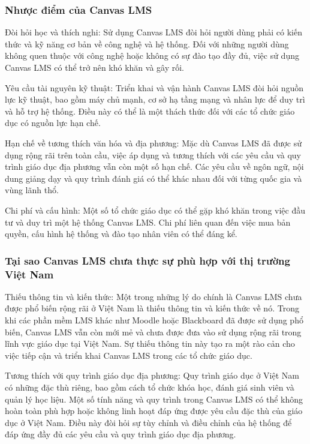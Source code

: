 \documentclass[../Thesis.tex]{subfiles}
\begin{document}
		\subsubsection{Nhược điểm của Canvas LMS}
			Đòi hỏi học và thích nghi: Sử dụng Canvas LMS đòi hỏi người dùng phải có kiến thức và kỹ năng cơ bản về công nghệ và hệ thống. Đối với những người dùng không quen thuộc với công nghệ hoặc không có sự đào tạo đầy đủ, việc sử dụng Canvas LMS có thể trở nên khó khăn và gây rối.

			Yêu cầu tài nguyên kỹ thuật: Triển khai và vận hành Canvas LMS đòi hỏi nguồn lực kỹ thuật, bao gồm máy chủ mạnh, cơ sở hạ tầng mạng và nhân lực để duy trì và hỗ trợ hệ thống. Điều này có thể là một thách thức đối với các tổ chức giáo dục có nguồn lực hạn chế.
			
			Hạn chế về tương thích văn hóa và địa phương: Mặc dù Canvas LMS đã được sử dụng rộng rãi trên toàn cầu, việc áp dụng và tương thích với các yêu cầu và quy trình giáo dục địa phương vẫn còn một số hạn chế. Các yêu cầu về ngôn ngữ, nội dung giảng dạy và quy trình đánh giá có thể khác nhau đối với từng quốc gia và vùng lãnh thổ.
			
			Chi phí và cấu hình: Một số tổ chức giáo dục có thể gặp khó khăn trong việc đầu tư và duy trì một hệ thống Canvas LMS. Chi phí liên quan đến việc mua bản quyền, cấu hình hệ thống và đào tạo nhân viên có thể đáng kể.

		\subsubsection{Tại sao Canvas LMS chưa thực sự phù hợp với thị trường Việt Nam}

			Thiếu thông tin và kiến thức: Một trong những lý do chính là Canvas LMS chưa được phổ biến rộng rãi ở Việt Nam là thiếu thông tin và kiến thức về nó. Trong khi các phần mềm LMS khác như Moodle hoặc Blackboard đã được sử dụng phổ biến, Canvas LMS vẫn còn mới mẻ và chưa được đưa vào sử dụng rộng rãi trong lĩnh vực giáo dục tại Việt Nam. Sự thiếu thông tin này tạo ra một rào cản cho việc tiếp cận và triển khai Canvas LMS trong các tổ chức giáo dục.

			Tương thích với quy trình giáo dục địa phương: Quy trình giáo dục ở Việt Nam có những đặc thù riêng, bao gồm cách tổ chức khóa học, đánh giá sinh viên và quản lý học liệu. Một số tính năng và quy trình trong Canvas LMS có thể không hoàn toàn phù hợp hoặc không linh hoạt đáp ứng được yêu cầu đặc thù của giáo dục ở Việt Nam. Điều này đòi hỏi sự tùy chỉnh và điều chỉnh của hệ thống để đáp ứng đầy đủ các yêu cầu và quy trình giáo dục địa phương.
\end{document}
